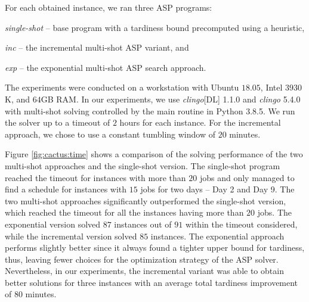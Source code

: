 \documentclass[submission,copyright,creativecommons]{eptcs}
\begin{document}
For each obtained instance, we ran three ASP programs: 
\begin{enumerate*}[label=\emph{(\arabic*)}]	
	\item \emph{single-shot} -- base program with a tardiness bound precomputed using a heuristic,
	\item \emph{inc} -- the incremental multi-shot ASP variant, and 
	\item \emph{exp} -- the exponential multi-shot ASP search approach.
\end{enumerate*}
The experiments were conducted on a workstation with Ubuntu $18.05$, Intel  $3930$K, and $64$GB RAM. In our experiments, we use \emph{clingo}[DL] 1.1.0 and \emph{clingo} 5.4.0 with multi-shot solving controlled by the main routine in Python 3.8.5. We run the solver up to a timeout of $2$ hours for each instance. For the incremental approach, we chose to use a constant tumbling window of $20$ minutes.

Figure \ref{fig:cactus:time} shows a comparison of the solving performance of the two multi-shot approaches and the single-shot version. The single-shot program reached the timeout for instances with more than $20$ jobs and only managed to find a schedule for instances with $15$ jobs for two days -- Day 2 and Day 9.
%
The two multi-shot approaches significantly outperformed the single-shot version, which reached the timeout for all the instances having more than $20$ jobs. The exponential version solved $87$ instances out of $91$ within the timeout considered, while the incremental version solved $85$ instances. The exponential approach performs slightly better since it always found a tighter upper bound for tardiness, thus, leaving fewer choices for the optimization strategy of the ASP solver. Nevertheless, 
in our experiments, the incremental variant was able to obtain better solutions for three instances with an average total tardiness improvement of 80 minutes.
\end{document}

